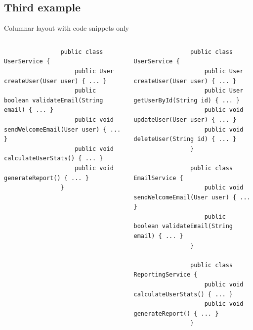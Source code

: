 \documentclass[aspectratio=169, 10pt]{beamer}
\begin{document}
\subsection{Third example}
\begin{frame}[fragile]{Columnar layout with code snippets only}
    \begin{columns}
        \centering
        \begin{column}{0.46\textwidth}
            \scriptsize
            \begin{verbatim}
                public class UserService {
                    public User createUser(User user) { ... }
                    public boolean validateEmail(String email) { ... }
                    public void sendWelcomeEmail(User user) { ... }
                    public void calculateUserStats() { ... }
                    public void generateReport() { ... }
                }
            \end{verbatim}
            \vspace{2.85cm}
        \end{column}

        \begin{column}{0.46\textwidth}
            \scriptsize
            \begin{verbatim}
                public class UserService {
                    public User createUser(User user) { ... }
                    public User getUserById(String id) { ... }
                    public void updateUser(User user) { ... }
                    public void deleteUser(String id) { ... }
                }
                
                public class EmailService {
                    public void sendWelcomeEmail(User user) { ... }
                    public boolean validateEmail(String email) { ... }
                }
                
                public class ReportingService {
                    public void calculateUserStats() { ... }
                    public void generateReport() { ... }
                }
            \end{verbatim}
        \end{column}
    \end{columns}
\end{frame}
\end{document}
